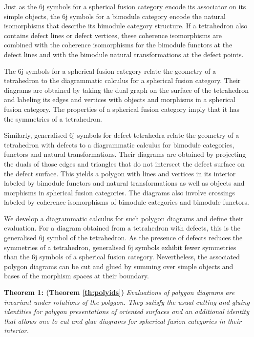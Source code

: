 \documentclass[1.5pt, a4paper]{article}
\begin{document}
Just as the  6j symbols for a spherical fusion category encode its associator on its simple objects, the 6j symbols for a bimodule category encode the natural isomorphisms that describe its bimodule category structure. If a tetrahedron also contains defect lines or defect vertices, these coherence isomorphisms are combined with the coherence isomorphisms for the bimodule functors at the defect lines and with the bimodule natural transformations at the defect points. 

The 6j symbols for a spherical fusion category relate the geometry of a tetrahedron to the diagrammatic calculus for a spherical fusion category. Their diagrams are 
obtained by taking the dual graph on the surface of the tetrahedron and labeling its edges and vertices with objects and morphisms in a spherical fusion category. The properties of a spherical fusion category imply that it has the symmetries of a tetrahedron. 

Similarly, generalised 6j symbols for defect tetrahedra relate the geometry of a tetrahedron with defects to a diagrammatic calculus for bimodule categories, functors and natural transformations. Their diagrams are obtained by projecting the duals of those edges and triangles that do not intersect the defect surface  on the defect surface. 
This yields a polygon with lines and vertices in its interior labeled by bimodule functors and natural transformations as well as objects and morphisms in spherical fusion categories. The diagrams also involve crossings labeled by coherence isomorphisms of bimodule categories and  bimodule functors. 



We develop a diagrammatic calculus for such polygon diagrams and define their evaluation. For a diagram obtained from a tetrahedron with defects, this is  the generalised  6j symbol of the tetrahedron.
As the presence of defects reduces the symmetries of a tetrahedron, generalised 6j symbols exhibit fewer symmetries than the 6j symbols of a spherical fusion category. Nevertheless, the associated polygon diagrams can be cut and glued by summing over simple objects and bases of the morphism spaces at their boundary. 

{\bf Theorem 1: (Theorem \ref{th:polyids})}
\emph{
Evaluations of polygon diagrams are invariant under rotations of the polygon. They satisfy the usual cutting and gluing identities for polygon presentations of oriented surfaces and
an additional identity that allows one to cut and glue diagrams for spherical fusion categories in their interior.
}
\end{document}
